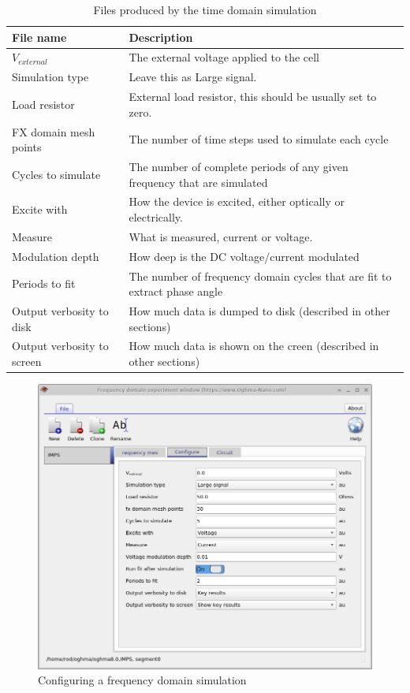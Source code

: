 \begin{table}
\begin{center}
\begin{tabular}{ |l|p{8cm}| } 
 \hline
	File name 					& 	Description  \\ 
 \hline
	$V_{external}$				&	The external voltage applied to the cell\\ 
	Simulation type				&	Leave this as Large signal.\\
	Load resistor				&	External load resistor, this should be usually set to zero.\\ 
	FX domain mesh points 		&	The number of time steps used to simulate each cycle\\ 
	Cycles to simulate 			&	The number of complete periods of any given frequency that are simulated \\ 
	Excite with					&	How the device is excited, either optically or electrically.\\ 
	Measure 					&	What is measured, current or voltage.\\
	Modulation depth			&	How deep is the DC voltage/current modulated\\
 	Periods to fit				&	The number of frequency domain cycles that are fit to extract phase angle\\
 	Output verbosity to disk	&	How much data is dumped to disk (described in other sections)\\
 	Output verbosity to screen	&	How much data is shown on the creen (described in other sections)\\
 \hline
\end{tabular}
\caption{Files produced by the time domain simulation}
\label{tab:fx_inputs}
\end{center}
\end{table}

\begin{figure}
\centering
\includegraphics[width=0.7\linewidth,height=0.5\linewidth]{./images/sim_editors/fx_domain_options.png}
\caption{Configuring a frequency domain simulation}
\label{fig:fx_domain_option}
\end{figure}


